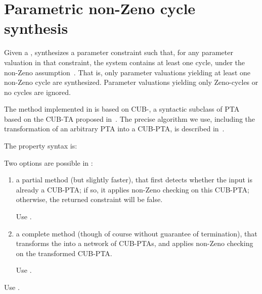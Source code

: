 \section{Parametric non-Zeno cycle synthesis}\label{ss:mode:Zeno}

Given a \NIPTA{}, \imitator{} synthesizes a parameter constraint such that, for any parameter valuation in that constraint, the system contains at least one cycle, under the non-Zeno assumption~\cite{ANPS17}.
That is, only parameter valuations yielding at least one non-Zeno cycle are synthesized.
Parameter valuations yielding only Zeno-cycles or no cycles are ignored.

The method implemented in \imitator{} is based on CUB-\IPTA{}, a syntactic subclass of PTA based on the CUB-TA proposed in~\cite{WSWLSDYL15}.
The precise algorithm we use, including the transformation of an arbitrary PTA into a CUB-PTA, is described in~\cite{ANPS17}.

The property syntax is:



Two options are possible in \imitator{}:
\begin{enumerate}
	\item a partial method (but slightly faster), that first detects whether the input \NIPTA{} is already a CUB-PTA; if so, it applies non-Zeno checking on this CUB-PTA; otherwise, the returned constraint will be false.

	      Use .

	\item a complete method (though of course without guarantee of termination), that transforms the \NIPTA{} into a network of CUB-PTAs, and applies non-Zeno checking on the transformed CUB-PTA.

	      Use .

\end{enumerate}

	      Use .


